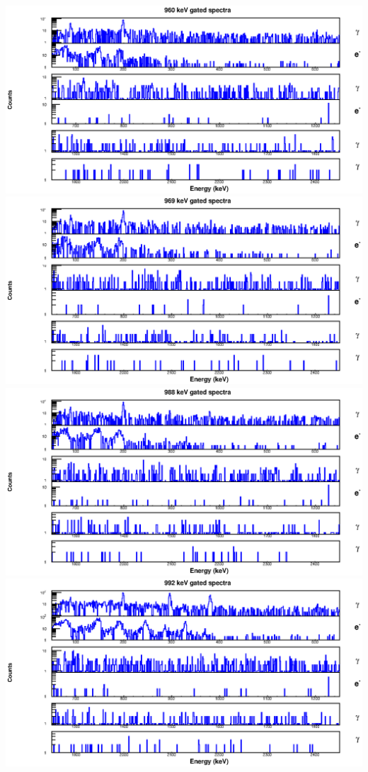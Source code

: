 \begin{landscape}
\includegraphics[scale=1.2]{156Gd_Appendix/960_combined.eps}
\includegraphics[scale=1.2]{156Gd_Appendix/969_combined.eps}
\includegraphics[scale=1.2]{156Gd_Appendix/988_combined.eps}
\includegraphics[scale=1.2]{156Gd_Appendix/992_combined.eps}

\end{landscape}
